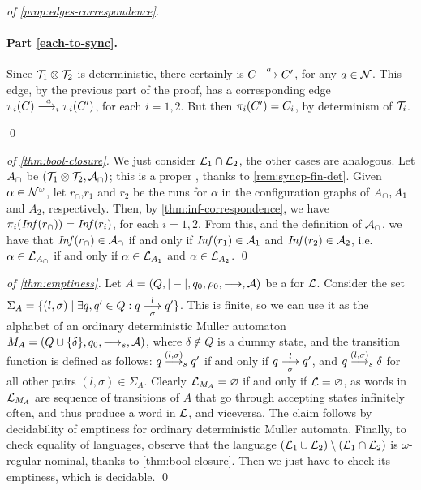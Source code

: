 \begin{proof}[of \cref{prop:edges-correspondence}]
\paragraph{Part \eqref{each-to-sync}.} 
Since $\mathcal{T}_1 \otimes \mathcal{T}_2$ is deterministic, there certainly is $C \overset{a}{\longrightarrow} C'$, for any $a \in \mathcal{N}$. This edge, by the previous part of the proof, has a corresponding edge $\pi_i(C) \overset{a}{\longrightarrow_{i}} \pi_i(C')$, for each $i=1,2$. But then $\pi_i(C') = C_i$, by determinism of $\mathcal{T}_i$.

\qed
\end{proof}

\begin{proof}[of \cref{thm:bool-closure}]
We just consider $\mathcal{L}_1 \cap \mathcal{L}_2$, the other cases are analogous. Let $A_\cap$ be $(\mathcal{T}_1 \otimes \mathcal{T}_2,\mathcal{A}_\cap)$; this is a proper \hdma{}, thanks to \cref{rem:syncp-fin-det}. Given $\alpha \in \mathcal{N}^\omega$, let $r_\cap$,$r_1$ and $r_2$ be the runs for $\alpha$ in the configuration graphs of $A_\cap,A_1$ and $A_2$, respectively. Then, by \cref{thm:inf-correspondence}, we have $\pi_i(\mathit{Inf}(r_\cap)) = \mathit{Inf}(r_i)$, for each $i=1,2$. From this, and the definition of $\mathcal{A}_\cap$, we have that $\mathit{Inf}(r_\cap) \in \mathcal{A}_\cap$ if and only if $\mathit{Inf}(r_1) \in \mathcal{A}_1$ and $\mathit{Inf}(r_2) \in \mathcal{A}_2$, i.e.\ $\alpha \in \mathcal{L}_{A_\cap}$ if and only if $\alpha \in \mathcal{L}_{A_1}$ and $\alpha \in\mathcal{L}_{A_2}$.
\qed
\end{proof}
%
\begin{proof}[of \cref{thm:emptiness}]
Let $A = (Q,|-|,q_0,\rho_0,\overset{}{\underset{}{\longrightarrow}},\mathcal{A})$ be a \hdma{} for $\mathcal{L}$. Consider the set $\Sigma_A = \{ (l,\sigma) \mid \exists q,q' \in Q : q \overset{l}{\underset{\sigma}{\longrightarrow}} q' \}$. This is finite, so we can use it as the alphabet of an ordinary deterministic Muller automaton $M_A = (Q \cup \{\delta\}, q_0,\overset{}{\longrightarrow}_s,\mathcal{A})$, where $\delta \notin Q$ is a dummy state, and the transition function is defined as follows: $q \overset{(l,\sigma)}{\longrightarrow}_s q'$ if and only if $q \overset{l}{\underset{\sigma}{\longrightarrow}} q'$, and $q \overset{(l,\sigma)}{\longrightarrow}_s \delta$ for all other pairs $(l,\sigma) \in \Sigma_A$. Clearly $\mathcal{L}_{M_A} = \varnothing$ if and only if $\mathcal{L} = \varnothing$, as words in $\mathcal{L}_{M_A}$ are sequence of transitions of $A$ that go through accepting states infinitely often, and thus produce a word in $\mathcal{L}$, and viceversa. The claim follows by decidability of emptiness for ordinary deterministic Muller automata. Finally, to check equality of languages, observe that the language $(\mathcal{L}_1 \cup \mathcal{L}_2) \setminus (\mathcal{L}_1 \cap \mathcal{L}_2 )$ is $\omega$-regular nominal, thanks to \cref{thm:bool-closure}. Then we just have to check its emptiness, which is decidable.
\qed
\end{proof}
